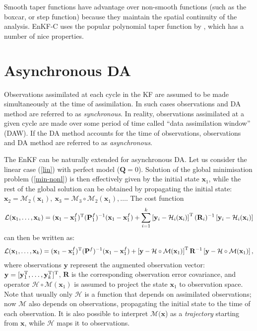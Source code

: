 \documentclass[11pt]{report}
\newcommand{\mb} {\mathbf}
\newcommand{\T}{^{\tiny \mathrm T}}
\begin{document}
Smooth taper functions have advantage over non-smooth functions (such as the boxcar, or step function) because they maintain the spatial continuity of the analysis.
EnKF-C uses the popular polynomial taper function by \citet{gas99a}, which has a number of nice properties.

\section{Asynchronous DA}

Observations assimilated at each cycle in the KF are assumed to be made simultaneously at the time of assimilation.
In such cases observations and DA method are referred to as \emph{synchronous}.
In reality, observations assimilated at a given cycle are made over some period of time called ``data assimilation window'' (DAW).
If the DA method accounts for the time of observations, observations and DA method are referred to as \emph{asynchronous}.

The EnKF can be naturally extended for asynchronous DA.
Let us consider the linear case (\ref{lin}) with perfect model ($\mb Q = 0$).
Solution of the global minimisation problem (\ref{min-nonl}) is then effectively given by the initial state $\mb x_1$, while the rest of the global solution can be obtained by propagating the initial state: $\mb x_2 = \mathcal M_2(\mb x_1),\ \mb x_3 = \mathcal M_3 \circ \mathcal M_2(\mb x_1), \dots$.
The cost function
\begin{align*}
  \mathcal L(\mb x_1, \dots, \mb x_k)  = (\mb x_1 - \mb x_1^f)\T (\mb P_1^f)^{-1} (\mb x_1 - \mb x_1^f) + \sum_{i = 1}^k \left [ \mb y_i - \mathcal H_i(\mb x_i) \right ] \T (\mb R_i)^{-1} \left [ \mb y_i - \mathcal H_i(\mb x_i) \right ]
\end{align*}
can then be written as:
\begin{align}
  \label{cost-async}
  \mathcal L(\mb x_1, \dots, \mb x_k)  = (\mb x_1 - \mb x_1^f)\T (\mb P^f)^{-1} (\mb x_1 - \mb x_1^f) + \left [ \mb y - \mathcal H \circ \mathcal M(\mb x_1) \right ] \T \mb R^{-1} \left [ \mb y - \mathcal H\circ \mathcal M(\mb x_1) \right ],
\end{align}
where observations $\mb y$ represent the augmented observation vector: $\mb y = [\mb y_1\T,\dots,\mb y_k\T]\T$, $\mb R$ is the corresponding observation error covariance, and operator $\mathcal H \circ \mathcal M (\mb x_1)$ is assumed to project the state $\mb x_1$ to observation space.
Note that usually only $\mathcal H$ is a function that depends on assimilated observations; now $\mathcal M$ also depends on observations, propagating the initial state to the time of each observation.
It is also possible to interpret $\mathcal M(\mb x$) as a \emph{trajectory} starting from $\mb x$, while $\mathcal H$ maps it to observations.
\end{document}
